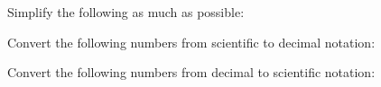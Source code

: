 \documentclass[12pt,letterpaper]{exam}
\begin{document}
\begin{questions}





\newpage
\question[6] Simplify the following as much as possible: \pspace
{}





\newpage
\question[6] Convert the following numbers from scientific to decimal notation: \pspace
{}

\vfill

\question[6] Convert the following numbers from decimal to scientific notation: \pspace
{}
\end{questions}
\end{document}
